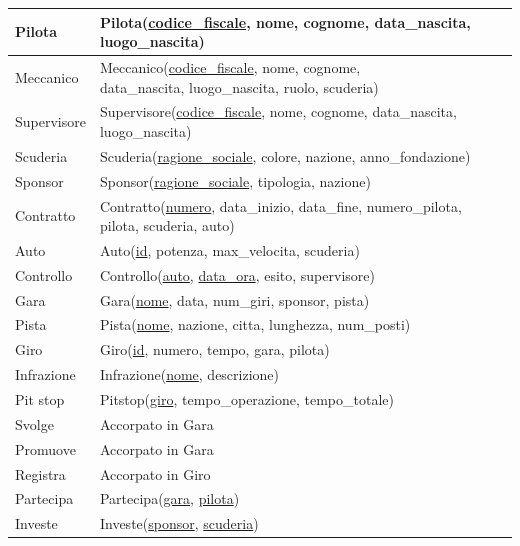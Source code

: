 \documentclass[11pt]{article}
\begin{document}
\begin{center}
{\begin{tabular}{ |l|l| }
            \hline
            Pilota & Pilota(\underline{codice\_fiscale}, nome, cognome, data\_nascita, luogo\_nascita) \\
            \hline
            Meccanico & \makecell[l]{Meccanico(\underline{codice\_fiscale}, nome, cognome,\\data\_nascita, luogo\_nascita, ruolo, scuderia)} \\
            \hline
            Supervisore & Supervisore(\underline{codice\_fiscale}, nome, cognome, data\_nascita, luogo\_nascita) \\
            \hline
            Scuderia & Scuderia(\underline{ragione\_sociale}, colore, nazione, anno\_fondazione) \\
            \hline
            Sponsor & Sponsor(\underline{ragione\_sociale}, tipologia, nazione) \\
            \hline
            Contratto & Contratto(\underline{numero}, data\_inizio, data\_fine, numero\_pilota, pilota, scuderia, auto) \\
            \hline
            Auto & Auto(\underline{id}, potenza, max\_velocita, scuderia) \\
            \hline
            Controllo & Controllo(\underline{auto}, \underline{data\_ora}, esito, supervisore) \\
            \hline
            Gara & Gara(\underline{nome}, data, num\_giri, sponsor, pista) \\
            \hline
            Pista & Pista(\underline{nome}, nazione, citta, lunghezza, num\_posti) \\
            \hline
            Giro & Giro(\underline{id}, numero, tempo, gara, pilota) \\
            \hline
            Infrazione & Infrazione(\underline{nome}, descrizione) \\
            \hline
            Pit stop & Pitstop(\underline{giro}, tempo\_operazione, tempo\_totale) \\
            \hline
            Svolge & Accorpato in Gara \\
            \hline
            Promuove & Accorpato in Gara \\
            \hline
            Registra & Accorpato in Giro \\
            \hline
            Partecipa & Partecipa(\underline{gara}, \underline{pilota}) \\
            \hline
            Investe & Investe(\underline{sponsor}, \underline{scuderia}) \\

\end{tabular}}
\end{center}
\end{document}

